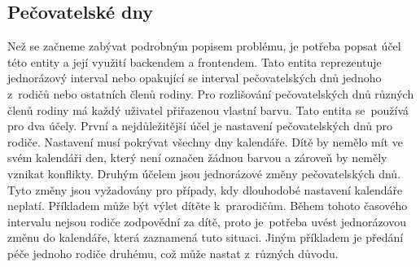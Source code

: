     \subsection{Pečovatelské dny}\label{analyza:pozadavky:caredays}
        Než se začneme zabývat podrobným popisem problému, je potřeba popsat účel této entity a její využití backendem a frontendem. Tato entita reprezentuje jednorázový interval nebo opakující se interval pečovatelských dnů jednoho z~rodičů nebo ostatních členů rodiny. Pro rozlišování pečovatelských dnů různých členů rodiny má každý uživatel přiřazenou vlastní barvu. Tato entita se~používá pro dva účely. První a nejdůležitější účel je nastavení pečovatelských dnů pro rodiče. Nastavení musí pokrývat všechny dny kalendáře. Dítě by nemělo mít ve svém kalendáři den, který není označen žádnou barvou a zároveň by neměly vznikat konflikty. Druhým účelem jsou jednorázové změny pečovatelských dnů. Tyto změny jsou vyžadovány pro případy, kdy dlouhodobé nastavení kalendáře neplatí. Příkladem může být výlet dítěte k~prarodičům. Během tohoto časového intervalu nejsou rodiče zodpovědní za dítě, proto je~potřeba uvést jednorázovou změnu do kalendáře, která zaznamená tuto situaci. Jiným příkladem je předání péče jednoho rodiče druhému, což může nastat z~různých důvodu.

